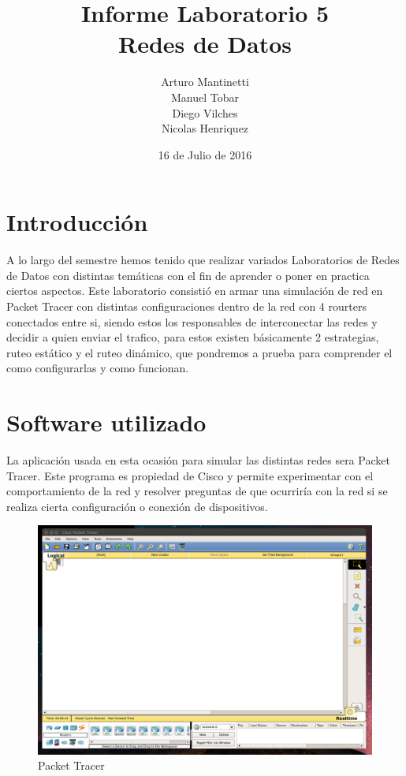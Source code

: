 \documentclass[spanish]{udpreport}
\title{Informe Laboratorio 5 \\ Redes de Datos}
\author{Arturo Mantinetti \\ Manuel Tobar \\ Diego Vilches \\ Nicolas Henriquez}
\date{16 de Julio de 2016}
\begin{document}
\maketitle

\tableofcontents

\chapter{Introducción}

A lo largo del semestre hemos tenido que realizar variados Laboratorios de Redes de Datos con distintas temáticas con el fin de aprender o poner en practica ciertos aspectos.
Este laboratorio consistió en armar una simulación de red en Packet Tracer con distintas configuraciones dentro de la red con 4 rourters conectados entre si, siendo estos los responsables de interconectar las redes y decidir a quien enviar el trafico, para estos existen básicamente 2 estrategias, ruteo estático y el ruteo dinámico, que pondremos a prueba para comprender el como configurarlas y como funcionan.

\chapter{Software utilizado}
La aplicación usada en esta ocasión para simular las distintas redes sera Packet Tracer. Este programa es propiedad de Cisco y permite experimentar con el comportamiento de la red y resolver preguntas de que ocurriría con la red si se realiza cierta configuración o conexión de dispositivos.

\begin{figure}[H]
	\centering
	\includegraphics[scale=.25]{imagenes/A0e.png}
	\caption{Packet Tracer}
	\label{fig:Figura 1.1}
\end{figure}
\end{document}
